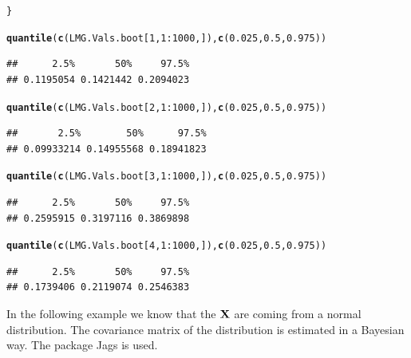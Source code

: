 \documentclass[11pt,a4paper,twoside]{book}\usepackage[]{graphicx}\usepackage[]{color}
\makeatletter
\newcommand{\hlnum}[1]{\textcolor[rgb]{0.686,0.059,0.569}{#1}}%
\newcommand{\hlopt}[1]{\textcolor[rgb]{0,0,0}{#1}}%
\newcommand{\hlstd}[1]{\textcolor[rgb]{0.345,0.345,0.345}{#1}}%
\newcommand{\hlkwd}[1]{\textcolor[rgb]{0.737,0.353,0.396}{\textbf{#1}}}%
\newenvironment{kframe}{%
 \def\at@end@of@kframe{}%
 \ifinner\ifhmode%
  \def\at@end@of@kframe{\end{minipage}}%
  \begin{minipage}{\columnwidth}%
 \fi\fi%
 \def\FrameCommand##1{\hskip\@totalleftmargin \hskip-\fboxsep
 \colorbox{shadecolor}{##1}\hskip-\fboxsep
     \hskip-\linewidth \hskip-\@totalleftmargin \hskip\columnwidth}%
 \MakeFramed {\advance\hsize-\width
   \@totalleftmargin\z@ \linewidth\hsize
   \@setminipage}}%
 {\par\unskip\endMakeFramed%
 \at@end@of@kframe}
\newenvironment{knitrout}{}{} %
\makeatother
\begin{document}
\begin{knitrout}
\begin{kframe}
\begin{alltt}
\hlstd{\}}

\hlkwd{quantile}\hlstd{(}\hlkwd{c}\hlstd{(LMG.Vals.boot[}\hlnum{1}\hlstd{,}\hlnum{1}\hlopt{:}\hlnum{1000}\hlstd{,]),} \hlkwd{c}\hlstd{(}\hlnum{0.025}\hlstd{,} \hlnum{0.5}\hlstd{,} \hlnum{0.975}\hlstd{))}
\end{alltt}
\begin{verbatim}
##      2.5%       50%     97.5% 
## 0.1195054 0.1421442 0.2094023
\end{verbatim}
\begin{alltt}
\hlkwd{quantile}\hlstd{(}\hlkwd{c}\hlstd{(LMG.Vals.boot[}\hlnum{2}\hlstd{,}\hlnum{1}\hlopt{:}\hlnum{1000}\hlstd{,]),} \hlkwd{c}\hlstd{(}\hlnum{0.025}\hlstd{,} \hlnum{0.5}\hlstd{,} \hlnum{0.975}\hlstd{))}
\end{alltt}
\begin{verbatim}
##       2.5%        50%      97.5% 
## 0.09933214 0.14955568 0.18941823
\end{verbatim}
\begin{alltt}
\hlkwd{quantile}\hlstd{(}\hlkwd{c}\hlstd{(LMG.Vals.boot[}\hlnum{3}\hlstd{,}\hlnum{1}\hlopt{:}\hlnum{1000}\hlstd{,]),} \hlkwd{c}\hlstd{(}\hlnum{0.025}\hlstd{,} \hlnum{0.5}\hlstd{,} \hlnum{0.975}\hlstd{))}
\end{alltt}
\begin{verbatim}
##      2.5%       50%     97.5% 
## 0.2595915 0.3197116 0.3869898
\end{verbatim}
\begin{alltt}
\hlkwd{quantile}\hlstd{(}\hlkwd{c}\hlstd{(LMG.Vals.boot[}\hlnum{4}\hlstd{,}\hlnum{1}\hlopt{:}\hlnum{1000}\hlstd{,]),} \hlkwd{c}\hlstd{(}\hlnum{0.025}\hlstd{,} \hlnum{0.5}\hlstd{,} \hlnum{0.975}\hlstd{))}
\end{alltt}
\begin{verbatim}
##      2.5%       50%     97.5% 
## 0.1739406 0.2119074 0.2546383
\end{verbatim}
\end{kframe}
\end{knitrout}

In the following example we know that the ${\mathbf{X}}$ are coming from a normal distribution. The covariance matrix of the distribution is estimated in a Bayesian way. The package Jags is used.
\end{document}
